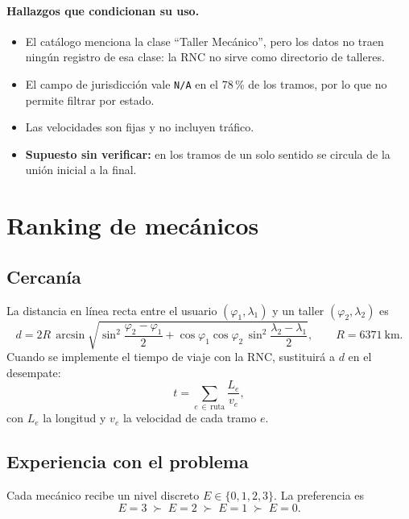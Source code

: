 \documentclass[11pt,a4paper]{article}
\newcommand{\code}[1]{\texttt{#1}}
\begin{document}
\paragraph{Hallazgos que condicionan su uso.}
\begin{itemize}[nosep]
  \item El catálogo menciona la clase ``Taller Mecánico'', pero los datos no traen ningún registro de esa clase: la RNC no sirve como directorio de talleres.
  \item El campo de jurisdicción vale \code{N/A} en el 78\,\% de los tramos, por lo que no permite filtrar por estado.
  \item Las velocidades son fijas y no incluyen tráfico.
  \item \textbf{Supuesto sin verificar:} en los tramos de un solo sentido se circula de la unión inicial a la final.
\end{itemize}

\section{Ranking de mecánicos}

\subsection{Cercanía}

La distancia en línea recta entre el usuario $(\varphi_1,\lambda_1)$ y un taller $(\varphi_2,\lambda_2)$ es
\begin{equation}
d = 2R\,\arcsin\!\sqrt{\sin^2\!\frac{\varphi_2-\varphi_1}{2}
      + \cos\varphi_1\cos\varphi_2\,\sin^2\!\frac{\lambda_2-\lambda_1}{2}},
\qquad R = 6371\ \text{km}.
\end{equation}
Cuando se implemente el tiempo de viaje con la RNC, sustituirá a $d$ en el desempate:
\begin{equation}
t = \sum_{e\,\in\,\text{ruta}} \frac{L_e}{v_e},
\end{equation}
con $L_e$ la longitud y $v_e$ la velocidad de cada tramo $e$.

\subsection{Experiencia con el problema}

Cada mecánico recibe un nivel discreto $E\in\{0,1,2,3\}$. La preferencia es
\begin{equation}
E=3 \;\succ\; E=2 \;\succ\; E=1 \;\succ\; E=0.
\end{equation}
\end{document}
